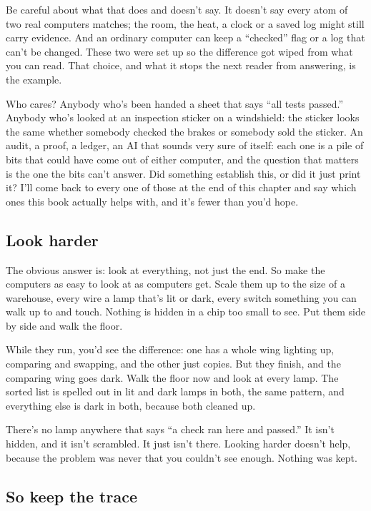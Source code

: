 \documentclass[11pt,twoside]{article}
\theoremstyle{thielethm}
\theoremstyle{thieledef}
\theoremstyle{thieledef}
\theoremstyle{thieledef}
\theoremstyle{thielethm}
\theoremstyle{thieleobs}
\theoremstyle{thielethm}
\begin{document}
Be careful about what that does and doesn't say. It doesn't say every atom of two real computers matches; the room, the heat, a clock or a saved log might still carry evidence. And an ordinary computer can keep a ``checked'' flag or a log that can't be changed. These two were set up so the difference got wiped from what you can read. That choice, and what it stops the next reader from answering, is the example.

Who cares? Anybody who's been handed a sheet that says ``all tests passed.'' Anybody who's looked at an inspection sticker on a windshield: the sticker looks the same whether somebody checked the brakes or somebody sold the sticker. An audit, a proof, a ledger, an AI that sounds very sure of itself: each one is a pile of bits that could have come out of either computer, and the question that matters is the one the bits can't answer. Did something establish this, or did it just print it? I'll come back to every one of those at the end of this chapter and say which ones this book actually helps with, and it's fewer than you'd hope.

\subsection{Look harder}

The obvious answer is: look at everything, not just the end. So make the computers as easy to look at as computers get. Scale them up to the size of a warehouse, every wire a lamp that's lit or dark, every switch something you can walk up to and touch. Nothing is hidden in a chip too small to see. Put them side by side and walk the floor.

While they run, you'd see the difference: one has a whole wing lighting up, comparing and swapping, and the other just copies. But they finish, and the comparing wing goes dark. Walk the floor now and look at every lamp. The sorted list is spelled out in lit and dark lamps in both, the same pattern, and everything else is dark in both, because both cleaned up.

There's no lamp anywhere that says ``a check ran here and passed.'' It isn't hidden, and it isn't scrambled. It just isn't there. Looking harder doesn't help, because the problem was never that you couldn't see enough. Nothing was kept.

\subsection{So keep the trace}
\end{document}
